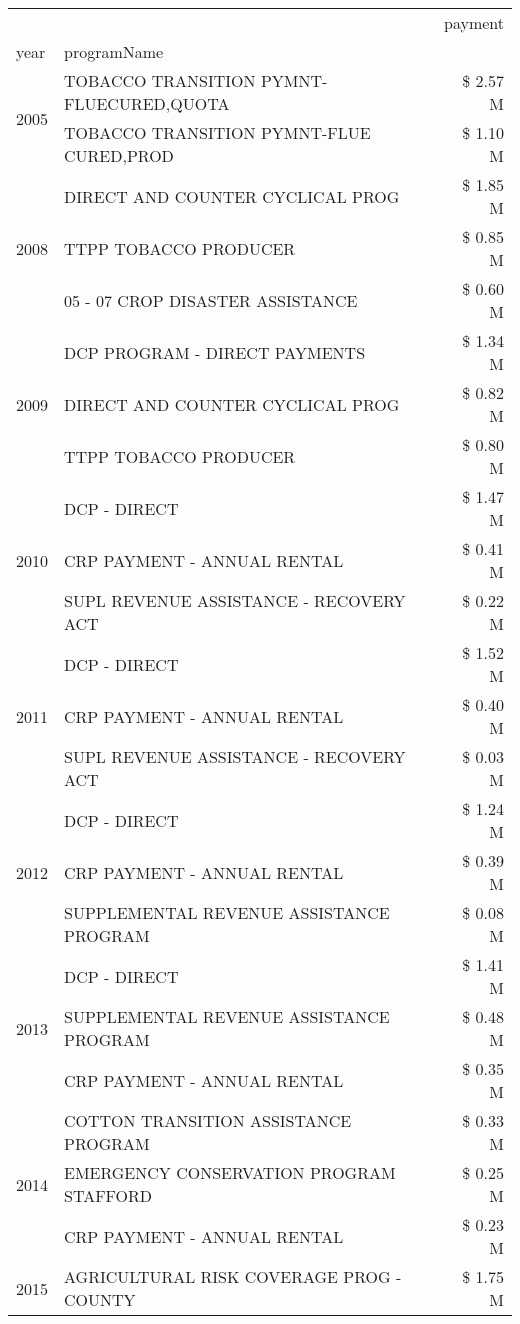 \begin{tabular}{llr}
\toprule
 &  & payment \\
year & programName &  \\
\midrule
\multirow[t]{2}{*}{2005} & TOBACCO TRANSITION PYMNT-FLUECURED,QUOTA & \$ 2.57 M \\
 & TOBACCO TRANSITION PYMNT-FLUE CURED,PROD & \$ 1.10 M \\
\cline{1-3}
\multirow[t]{3}{*}{2008} & DIRECT AND COUNTER CYCLICAL PROG & \$ 1.85 M \\
 & TTPP TOBACCO PRODUCER & \$ 0.85 M \\
 & 05 - 07 CROP DISASTER ASSISTANCE & \$ 0.60 M \\
\cline{1-3}
\multirow[t]{3}{*}{2009} & DCP PROGRAM - DIRECT PAYMENTS & \$ 1.34 M \\
 & DIRECT AND COUNTER CYCLICAL PROG & \$ 0.82 M \\
 & TTPP TOBACCO PRODUCER & \$ 0.80 M \\
\cline{1-3}
\multirow[t]{3}{*}{2010} & DCP - DIRECT & \$ 1.47 M \\
 & CRP PAYMENT - ANNUAL RENTAL & \$ 0.41 M \\
 & SUPL REVENUE ASSISTANCE - RECOVERY ACT & \$ 0.22 M \\
\cline{1-3}
\multirow[t]{3}{*}{2011} & DCP - DIRECT & \$ 1.52 M \\
 & CRP PAYMENT - ANNUAL RENTAL & \$ 0.40 M \\
 & SUPL REVENUE ASSISTANCE - RECOVERY ACT & \$ 0.03 M \\
\cline{1-3}
\multirow[t]{3}{*}{2012} & DCP - DIRECT & \$ 1.24 M \\
 & CRP PAYMENT - ANNUAL RENTAL & \$ 0.39 M \\
 & SUPPLEMENTAL REVENUE ASSISTANCE PROGRAM & \$ 0.08 M \\
\cline{1-3}
\multirow[t]{3}{*}{2013} & DCP - DIRECT & \$ 1.41 M \\
 & SUPPLEMENTAL REVENUE ASSISTANCE PROGRAM & \$ 0.48 M \\
 & CRP PAYMENT - ANNUAL RENTAL & \$ 0.35 M \\
\cline{1-3}
\multirow[t]{3}{*}{2014} & COTTON TRANSITION ASSISTANCE PROGRAM & \$ 0.33 M \\
 & EMERGENCY CONSERVATION PROGRAM STAFFORD & \$ 0.25 M \\
 & CRP PAYMENT - ANNUAL RENTAL & \$ 0.23 M \\
\cline{1-3}
\multirow[t]{3}{*}{2015} & AGRICULTURAL RISK COVERAGE PROG - COUNTY & \$ 1.75 M \\

\end{tabular}
